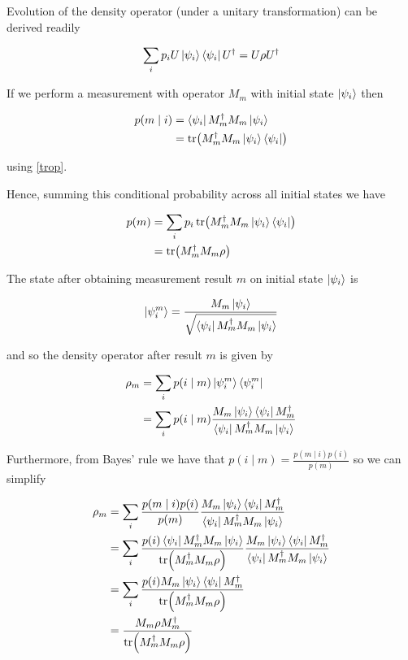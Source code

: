 \documentclass[main.tex]{subfiles}
\begin{document}
Evolution of the density operator (under a unitary transformation) can be derived readily

\begin{align*}
\sum_i p_i U\ket{\psi_i}\bra{\psi_i}U^\dag = U\rho U^\dag
\end{align*}

If we perform a measurement with operator $M_m$ with initial state $\ket{\psi_i}$ then

\begin{align*}
p(m\mid i) &= \bra{\psi_i} M_m^\dag M_m \ket{\psi_i} \\
&= \tr(M_m^\dag M_m \ket{\psi_i}\bra{\psi_i})
\end{align*}

using \ref{trop}.

Hence, summing this conditional probability across all initial states we have

\begin{align*}
	p(m) &= \sum_i p_i \tr(M_m^\dag M_m \ket{\psi_i}\bra{\psi_i}) \\
	&= \tr(M_m^\dag M_m \rho)
\end{align*}

The state after obtaining measurement result $m$ on initial state $\ket{\psi_i}$ is

\begin{align*}
\ket{\psi_i^m} = \frac{M_m \ket{\psi_i}}{\sqrt{\bra{\psi_i}M_m^\dag M_m\ket{\psi_i}}}
\end{align*}

and so the density operator after result $m$ is given by

\begin{align*}
	\rho_m &= \sum_i p(i \mid m ) \ket{\psi_i^m} \bra{\psi_i^m} \\
	&= \sum_i p(i \mid m )\frac{M_m \ket{\psi_i}\bra{\psi_i}M_m^\dag}{\bra{\psi_i}M_m^\dag M_m\ket{\psi_i}}
\end{align*}

Furthermore, from Bayes' rule we have that $p(i \mid m) = \frac{p(m \mid i)p(i)}{p(m)}$ so we can simplify

\begin{align*}
	\rho_m &= \sum_i \frac{p(m \mid i)p(i)}{p(m)}\frac{M_m \ket{\psi_i}\bra{\psi_i}M_m^\dag}{\bra{\psi_i}M_m^\dag M_m\ket{\psi_i}} \\
	&= \sum_i \frac{p(i)\bra{\psi_i} M_m^\dag M_m \ket{\psi_i}}{\tr(M_m^\dag M_m \rho)}\frac{M_m \ket{\psi_i}\bra{\psi_i}M_m^\dag}{\bra{\psi_i}M_m^\dag M_m\ket{\psi_i}} \\
	&= \sum_i \frac{p(i)M_m \ket{\psi_i}\bra{\psi_i}M_m^\dag}{\tr(M_m^\dag M_m \rho)} \\
	&= \frac{M_m\rho M_m^\dag}{\tr(M_m^\dag M_m \rho)}
\end{align*}
\end{document}

